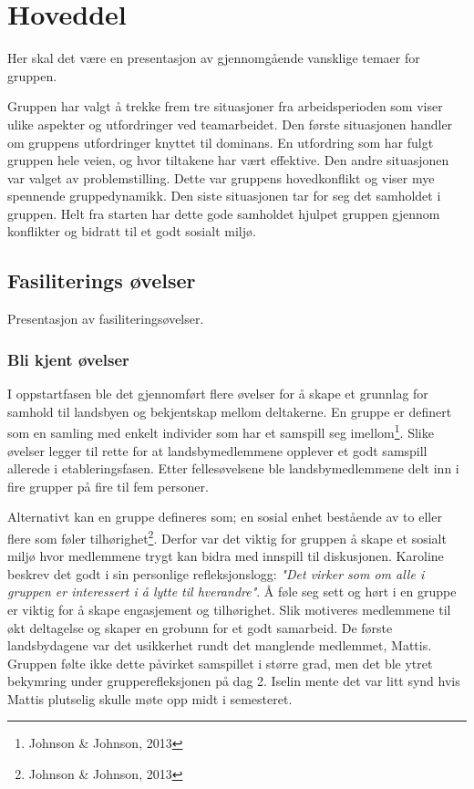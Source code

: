 \section{Hoveddel}
Her skal det være en presentasjon av gjennomgående vansklige temaer for gruppen.

Gruppen har valgt å trekke frem tre situasjoner fra arbeidsperioden som viser ulike aspekter og utfordringer ved teamarbeidet. Den første situasjonen handler om gruppens utfordringer knyttet til dominans. En utfordring som har fulgt gruppen hele veien, og hvor tiltakene har vært effektive. Den andre situasjonen var valget av problemstilling. Dette var gruppens hovedkonflikt og viser mye spennende gruppedynamikk. Den siste situasjonen tar for seg det samholdet i gruppen. Helt fra starten har dette gode samholdet hjulpet gruppen gjennom konflikter og bidratt til et godt sosialt miljø.

\subsection{Fasiliterings øvelser}
Presentasjon av fasiliteringsøvelser.

\subsubsection{Bli kjent øvelser} %
I oppstartfasen ble det gjennomført flere øvelser for å skape et grunnlag for samhold til landsbyen og bekjentskap mellom deltakerne. En gruppe er definert som en samling med enkelt individer som har et samspill seg imellom\footnote[1]{Johnson \& Johnson, 2013}. Slike øvelser legger til rette for at landsbymedlemmene opplever et godt samspill allerede i etableringsfasen. Etter fellesøvelsene ble landsbymedlemmene delt inn i fire grupper på fire til fem personer. 

Alternativt kan en gruppe defineres som; en sosial enhet bestående av to eller flere som føler tilhørighet\footnote[1]{Johnson \& Johnson, 2013}. Derfor var det viktig for gruppen å skape et sosialt miljø hvor medlemmene trygt kan bidra med innspill til diskusjonen. Karoline beskrev det godt i sin personlige refleksjonslogg: \textit{"Det virker som om alle i gruppen er interessert i å lytte til hverandre"}. Å føle seg sett og hørt i en gruppe er viktig for å skape engasjement og tilhørighet. Slik motiveres medlemmene til økt deltagelse og skaper en grobunn for et godt samarbeid.
De første landsbydagene var det usikkerhet rundt det manglende medlemmet, Mattis. Gruppen følte ikke dette påvirket samspillet i større grad, men det ble ytret bekymring under grupperefleksjonen på dag 2. Iselin mente det var litt synd hvis Mattis plutselig skulle møte opp midt i semesteret. 
\newline

